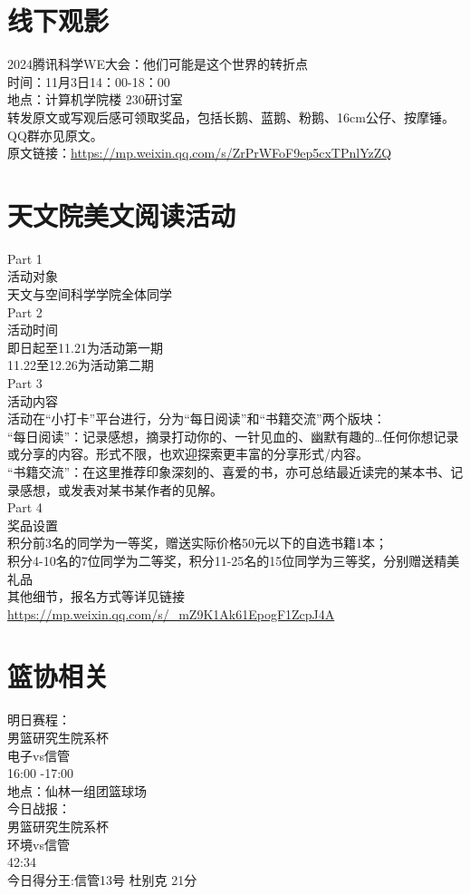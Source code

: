 \documentclass[letterpaper, 12pt]{article}
\begin{document}
\begin{multicols}{2}
\section{线下观影}
2024腾讯科学WE大会：他们可能是这个世界的转折点\\
时间：11月3日14：00-18：00\\
地点：计算机学院楼 230研讨室\\
转发原文或写观后感可领取奖品，包括长鹅、蓝鹅、粉鹅、16cm公仔、按摩锤。\\
QQ群亦见原文。\\
原文链接：\url{https://mp.weixin.qq.com/s/ZrPrWFoF9ep5cxTPnlYzZQ}
\section{天文院美文阅读活动}
Part 1\\
活动对象\\
天文与空间科学学院全体同学\\
Part 2\\
活动时间\\
即日起至11.21为活动第一期\\
11.22至12.26为活动第二期\\
Part 3\\
活动内容\\
活动在“小打卡”平台进行，分为“每日阅读”和“书籍交流”两个版块：\\
“每日阅读”：记录感想，摘录打动你的、一针见血的、幽默有趣的…任何你想记录或分享的内容。形式不限，也欢迎探索更丰富的分享形式/内容。\\
“书籍交流”：在这里推荐印象深刻的、喜爱的书，亦可总结最近读完的某本书、记录感想，或发表对某书某作者的见解。\\
Part 4\\
奖品设置\\
积分前3名的同学为一等奖，赠送实际价格50元以下的自选书籍1本；\\
积分4-10名的7位同学为二等奖，积分11-25名的15位同学为三等奖，分别赠送精美礼品\\
其他细节，报名方式等详见链接\url{https://mp.weixin.qq.com/s/_mZ9K1Ak61EpogF1ZcpJ4A}


\section{篮协相关}
明日赛程：\\
男篮研究生院系杯\\
电子vs信管\\
16:00 -17:00\\
地点：仙林一组团篮球场\\
今日战报：\\
男篮研究生院系杯\\
环境vs信管\\
42:34\\
今日得分王:信管13号 杜别克 21分\\


\end{multicols}
\end{document}
